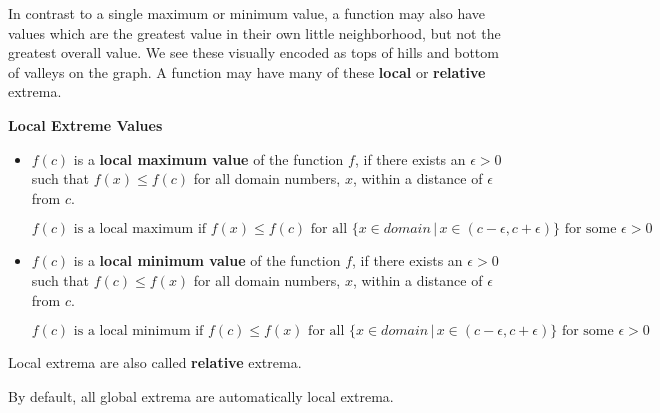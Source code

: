 \documentclass{ximera}
\begin{document}
In contrast to a single maximum or minimum value, a function may also have values which are the greatest value in their own little neighborhood, but not the greatest overall value.  We see these visually encoded as tops of hills and bottom of valleys on the graph.  A function may have many of these \textbf{local} or \textbf{relative} extrema.






\begin{definition} \textbf{\textcolor{green!50!black}{Local Extreme Values}} 
\begin{itemize}
\item $f(c)$ is a \textbf{local maximum value} of the function $f$, if there exists an $\epsilon > 0$ such that $f(x) \leq f(c)$ for all domain numbers, $x$, within a distance of $\epsilon$ from $c$. 

\[  f(c) \text{ is a local maximum if } f(x) \leq f(c) \text{ for all } \{ x \in domain \, | \, x \in (c - \epsilon, c + \epsilon) \} \text{ for some } \epsilon > 0 \]







\item $f(c)$ is a \textbf{local minimum value} of the function $f$, if there exists an $\epsilon > 0$ such that $f(c) \leq f(x)$ for all domain numbers, $x$, within a distance of $\epsilon$ from $c$. 



\[  f(c) \text{ is a local minimum if } f(c) \leq f(x) \text{ for all } \{ x \in domain \, | \, x \in (c - \epsilon, c + \epsilon) \} \text{ for some } \epsilon > 0 \]
\end{itemize}

Local extrema are also called \textbf{relative} extrema.

\end{definition}





By default, all global extrema are automatically local extrema.
\end{document}
